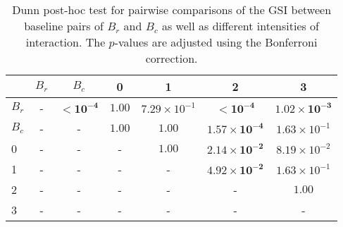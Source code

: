 \begin{table}
\centering
\caption{Dunn post-hoc test for pairwise comparisons of the GSI between baseline pairs of $B_r$ and $B_c$ as well as different intensities of interaction. The $p$-values are adjusted using the Bonferroni correction.}
\label{tab:dunn_gsi}
\begin{tabular}{lcccccc}
\toprule
 & $B_r$ & $B_c$ & 0 & 1 & 2 & 3 \\
\midrule
$B_r$ & - & $\mathbf{< 10^{-4}}$ & $1.00$ & $7.29 \times 10^{-1}$ & $\mathbf{< 10^{-4}}$ & $\mathbf{1.02 \times 10^{-3}}$ \\
$B_c$ & - & - & $1.00$ & $1.00$ & $\mathbf{1.57 \times 10^{-4}}$ & $1.63 \times 10^{-1}$ \\
0 & - & - & - & $1.00$ & $\mathbf{2.14 \times 10^{-2}}$ & $8.19 \times 10^{-2}$ \\
1 & - & - & - & - & $\mathbf{4.92 \times 10^{-2}}$ & $1.63 \times 10^{-1}$ \\
2 & - & - & - & - & - & $1.00$ \\
3 & - & - & - & - & - & - \\
\bottomrule
\end{tabular}
\end{table}
